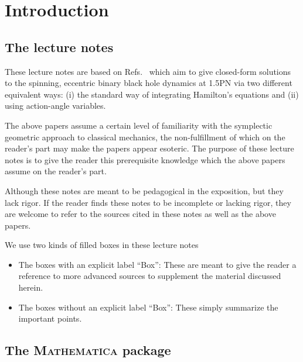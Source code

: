 \chapter{Introduction}


\section{The lecture notes}

These lecture notes are based on Refs.~\cite{tanay2021action, tanay2021integrability, Cho:2019brd}
 which aim to give closed-form solutions to the spinning, eccentric
binary black hole dynamics at 1.5PN via two different equivalent ways: (i)
the standard way of integrating Hamilton's equations and (ii) using action-angle variables.



The above papers assume a certain level of familiarity
with the symplectic geometric approach to classical mechanics, the non-fulfillment
of which on the reader's part may make the papers appear esoteric.
The purpose of these lecture notes is to give the reader this prerequisite
 knowledge which the above papers assume on the reader's part. 

Although these notes are meant to be pedagogical 
in the exposition, but they
lack rigor. If the reader 
finds these notes to be incomplete or lacking rigor, they are welcome to
refer to the sources cited in these notes as well as the above papers.



We use two kinds of filled boxes in these lecture notes
\begin{itemize}
\item The boxes with an explicit label ``Box'': These are meant
to give the reader a reference to more advanced sources to supplement
the material discussed herein. 
\item The boxes without an explicit label ``Box'': These simply 
summarize the important points.
\end{itemize}


\section{The \textsc{Mathematica} package}

